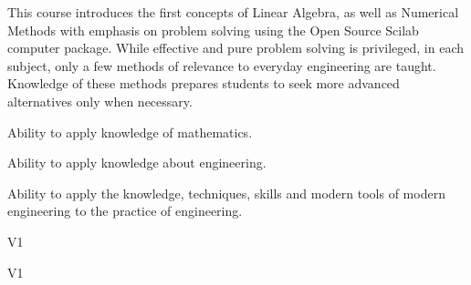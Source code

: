 \begin{syllabus}


\begin{justification}
   This course introduces the first concepts of Linear Algebra, as well as Numerical Methods with emphasis on problem solving using the Open Source Scilab computer package. While effective and pure problem solving is privileged, in each subject, only a few methods of relevance to everyday engineering are taught. Knowledge of these methods prepares students to seek more advanced alternatives only when necessary.
 
 \end{justification}
 
 \begin{goals}
 \item Ability to apply knowledge of mathematics.
 \item Ability to apply knowledge about engineering.
 \item Ability to apply the knowledge, techniques, skills and modern tools of modern engineering to the practice of engineering.
 \end{goals}
 
 \begin{outcomes}{V1}
     \item {}
     \item {}
 \end{outcomes}
 
 \begin{competences}{V1}
     \item {} 
     \item {} 
     \item {} 
 \end{competences}
 

\end{syllabus}
